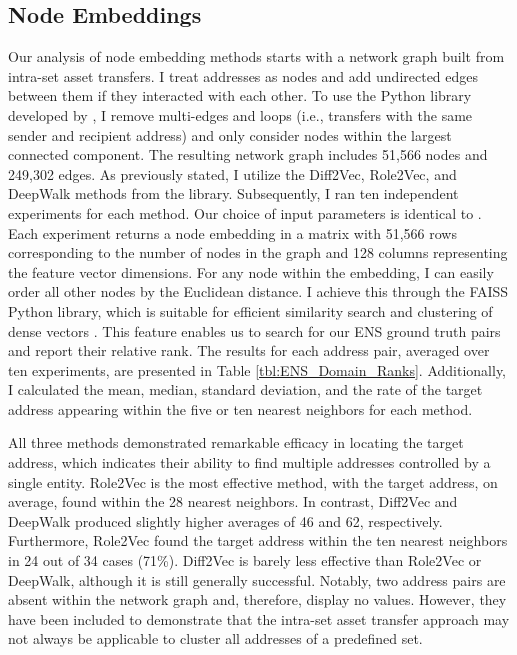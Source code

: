 \documentclass[12pt,a4paper,titlepage,oneside,english]{article}
\begin{document}
\subsection{Node Embeddings}
Our analysis of node embedding methods starts with a network graph built from intra-set asset transfers. I treat addresses as nodes and add undirected edges between them if they interacted with each other. \newline
To use the Python library developed by \cite{karateclub}, I remove multi-edges and loops (i.e., transfers with the same sender and recipient address) and only consider nodes within the largest connected component. The resulting network graph includes 51,566 nodes and 249,302 edges. As previously stated, I utilize the Diff2Vec, Role2Vec, and DeepWalk methods from the library. \newline
Subsequently, I ran ten independent experiments for each method. Our choice of input parameters is identical to \cite{Beres2020}. Each experiment returns a node embedding in a matrix with 51,566 rows corresponding to the number of nodes in the graph and 128 columns representing the feature vector dimensions. \newline
For any node within the embedding, I can easily order all other nodes by the Euclidean distance. I achieve this through the FAISS Python library, which is suitable for efficient similarity search and clustering of dense vectors \citep{johnson2019faiss}.\newline 
This feature enables us to search for our ENS ground truth pairs and report their relative rank. The results for each address pair, averaged over ten experiments, are presented in Table \ref{tbl:ENS_Domain_Ranks}. Additionally, I calculated the mean, median, standard deviation, and the rate of the target address appearing within the five or ten nearest neighbors for each method.

All three methods demonstrated remarkable efficacy in locating the target address, which indicates their ability to find multiple addresses controlled by a single entity.
Role2Vec is the most effective method, with the target address, on average, found within the 28 nearest neighbors. In contrast, Diff2Vec and DeepWalk produced slightly higher averages of 46 and 62, respectively. Furthermore, Role2Vec found the target address within the ten nearest neighbors in 24 out of 34 cases (71\%). Diff2Vec is barely less effective than Role2Vec or DeepWalk, although it is still generally successful. \newline
Notably, two address pairs are absent within the network graph and, therefore, display no values. However, they have been included to demonstrate that the intra-set asset transfer approach may not always be applicable to cluster all addresses of a predefined set.
\end{document}
